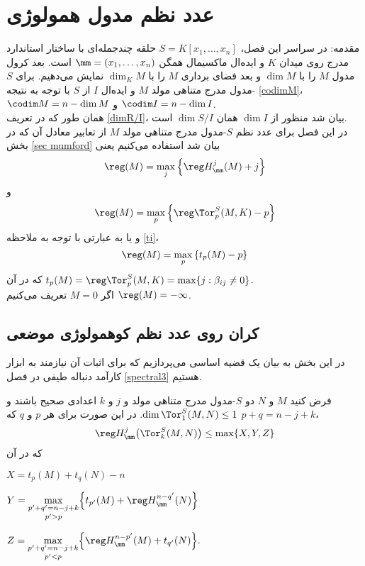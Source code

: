 \chapter{عدد نظم مدول همولوژی }\label{regularity-asli}

\thispagestyle{empty}
\newpage
{\large{مقدمه:}}
در سراسر این فصل، $S=K[x_1,\ldots,x_n]$ حلقه چندجمله‌ای‌ با ساختار استاندارد مدرج روی میدان $K$ و ایده‌ال ماکسیمال همگن ${\mm}=(x_1,\ldots,x_n)$ است.
بعد کرول مدول $M$ را با $\dim M$ و بعد فضای برداری $M$ را با $\dim_KM$ نمایش می‌دهیم. برای $S$-مدول مدرج متناهی مولد $M$ و ایده‌ال $I$ از $S$ با توجه به نتیجه
\ref{codimM}،
$\codim M=n-\dim M$
و
$ \codim I=n-\dim I$.\\
همان طور که در تعریف \ref{dimR/I}،
بیان شد منظور از $\dim I$ همان $\dim S/I$ است. \\
در این فصل برای عدد نظم $S$-مدول مدرج متناهی مولد $M$ از تعابیر معادل آن که در بخش \ref{sec mumford}
بیان شد استفاده می‌کنیم یعنی
$$\reg(M)=\max_j\left\{\reg H^j_{\mm}(M)+j\right\}$$
و
$$\reg(M)=\max_p\left\{ \reg \Tor^S_p(M,K)-p\right\}$$
و یا به عبارتی با توجه به ملاحظه \ref{ti}،
$$\reg(M)=\max_p\left\{ t_p(M)-p\right\}$$
که در آن
$t_p(M)=\reg\Tor^S_p(M,K)=\max\{j: \beta_{ij}\neq 0\}$.\\
اگر $M=0$ تعریف می‌کنیم $\reg(M)=-\infty$.
\section{{کران روی عدد نظم کوهمولوژی موضعی }}
در این بخش به بیان یک قضیه اساسی می‌پردازیم که برای اثبات آن نیازمند به ابزار کارآمد دنباله طیفی در فصل
\ref{spectral3}
هستیم.
\begin{theo}\label{reg-asli}
فرض کنید $M$ و $N$ دو $S$-مدول مدرج متناهی مولد و $j$ و $k$ اعدادی صحیح باشند و $\dim\Tor^S_1(M,N)\leq 1$. در این صورت برای هر $p$ و $q$ که
$p+q=n-j+k$،
$$\reg H^j_{\mm}\big(\Tor^S_k(M,N)\big)\leq \max\{X,Y,Z\}$$
که در آن
\begin{flushleft}
$X=t_p(M)+t_q(N)-n$
\end{flushleft}
\begin{flushleft}
$Y=\underset{p'>p}{\underset{p'+q'=n-j+k}{\max}}\Big\{t_{p'}(M)+\reg H^{n-q'}_{\mm}(N)\Big\}$
\end{flushleft}
\begin{flushleft}
$Z=\underset{p'<p}{\underset{p'+q'=n-j+k}{\max}}\Big\{\reg H^{n-p'}_{\mm}(M)+t_{q'}(N)\Big\}.$
\end{flushleft}
\end{theo}




